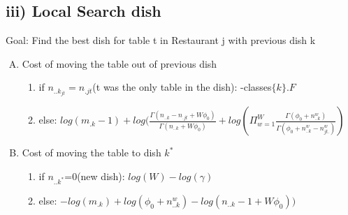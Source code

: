 \documentclass{article}
\begin{document}
\begin{spacing}{1.1}
\subsection{iii) Local Search dish}
Goal: Find the best dish for table t in Restaurant j with previous dish k
\begin{enumerate}[(A)]
\item Cost of moving the table out of previous dish
\begin{enumerate}
 \item if $n_{..k_{jt}}=n_{.jt}$(t was the only table in the dish): -classes$\{k\}.F$
 \item else: $log(m_{.k}-1)+log(\frac{\Gamma(n_{..k}-n_{.jt}+W\phi_{0})}{\Gamma(n_{..k}+W\phi_{0})}+log(\Pi_{w=1}^{W}\frac{\Gamma(\phi_{0}+n_{..k}^{w})}{\Gamma(\phi_{0}+n_{..k}^{w}-n_{jt.}^{w})})$
\end{enumerate}

\item Cost of moving the table to dish $k^{*}$
\begin{enumerate}
 \item if $n_{..k^{*}}$=0(new dish): $log(W)-log(\gamma)$
 \item else: $-log(m_{.k})+log(\phi_{0}+n_{..k}^{w})-log(n_{..k}-1+W\phi_{0}))$
\end{enumerate}

\end{enumerate}



\end{spacing}
\end{document}
